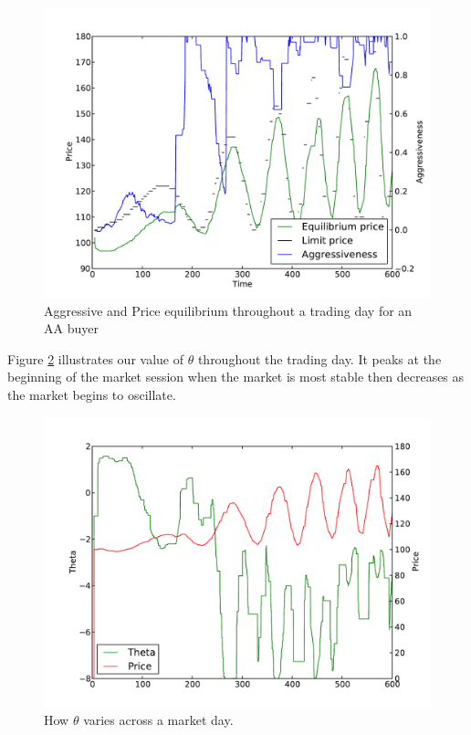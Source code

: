 \documentclass[preprint]{acm_proc_article-sp} %
\begin{document}
\begin{figure}[H] 
\centering
\includegraphics[width=\columnwidth]{graphs_and_stats/graph_aggressiveness_vs_price.pdf}
\caption{Aggressive and Price equilibrium throughout a trading day for an AA
buyer}
\label{fig:avtime}
\end{figure}





Figure \ref{fig:theta_v_time} illustrates our value of $\theta$
throughout the trading day. It peaks at the beginning of the market session
when the market is most stable then decreases as the market begins to
oscillate.
\begin{figure}[H]
  \centering
  \includegraphics[width=\columnwidth]{graphs_and_stats/graph_theta_vs_time.pdf}
  \caption{How $\theta$ varies across a market day.}
  \label{fig:theta_v_time}
\end{figure}
\end{document}
